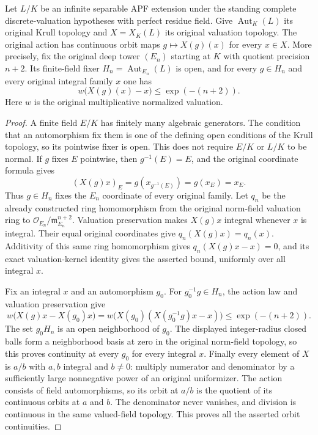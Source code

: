 \begin{lemma}
\label{fw:norm-field-action-continuity}
\leanok
{}
Let $L/K$ be an infinite separable APF extension under the standing
complete discrete-valuation hypotheses with perfect residue field.
Give $\operatorname{Aut}_K(L)$ its original Krull topology and
$X=X_K(L)$ its original valuation topology. The original action has
continuous orbit maps $g\mapsto X(g)(x)$ for every $x\in X$.
More precisely, fix the original deep tower $(E_n)$ starting at $K$
with quotient precision $n+2$. Its finite-field fixer
$H_n=\operatorname{Aut}_{E_n}(L)$ is open, and for every $g\in H_n$
and every original integral family $x$ one has
\[
 w\bigl(X(g)(x)-x\bigr)\leq \exp(-(n+2)).
\]
Here $w$ is the original multiplicative normalized valuation.
\end{lemma}
\begin{proof}
A finite field $E/K$ has finitely many algebraic generators. The condition
that an automorphism fix them is one of the defining open conditions
of the Krull topology, so its pointwise fixer is open. This does not
require $E/K$ or $L/K$ to be normal.
If $g$ fixes $E$ pointwise, then $g^{-1}(E)=E$, and the original
coordinate formula gives
\[
 (X(g)x)_E=g(x_{g^{-1}(E)})=g(x_E)=x_E.
\]
Thus $g\in H_n$ fixes the $E_n$ coordinate of every original family.
Let $q_n$ be the already constructed ring homomorphism from the original
norm-field valuation ring to
$\mathcal O_{E_n}/\mathfrak m_{E_n}^{n+2}$.
Valuation preservation makes $X(g)x$ integral whenever $x$ is integral.
Their equal original coordinates give $q_n(X(g)x)=q_n(x)$.
Additivity of this same ring homomorphism gives
$q_n(X(g)x-x)=0$, and its exact valuation-kernel identity gives the
asserted bound, uniformly over all integral $x$.

Fix an integral $x$ and an automorphism $g_0$. For $g_0^{-1}g\in H_n$,
the action law and valuation preservation give
\[
 w\bigl(X(g)x-X(g_0)x\bigr)
 =w\bigl(X(g_0)(X(g_0^{-1}g)x-x)\bigr)
 \leq\exp(-(n+2)).
\]
The set $g_0H_n$ is an open neighborhood of $g_0$. The displayed
integer-radius closed balls form a neighborhood basis at zero in the
original norm-field topology, so this proves continuity at every $g_0$
for every integral $x$. Finally every element of $X$ is $a/b$ with
$a,b$ integral and $b\ne0$: multiply numerator and denominator by a
sufficiently large nonnegative power of an original uniformizer.
The action consists of field automorphisms, so its orbit at $a/b$
is the quotient of its continuous orbits at $a$ and $b$.
The denominator never vanishes, and division is continuous in the same
valued-field topology. This proves all the asserted orbit continuities.
\end{proof}

